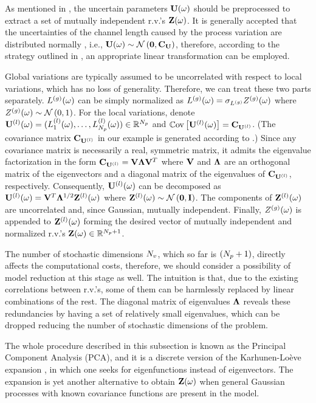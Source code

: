 As mentioned in , the uncertain parameters $\mathbf{U}(\omega)$ should be preprocessed to extract a set of mutually independent r.v.'s $\mathbf{Z}(\omega)$. It is generally accepted that the uncertainties of the channel length caused by the process variation are distributed normally \cite{srivastava2010, liu2007, juan2012}, i.e., $\vU(\o) \sim \normal{\vZero}{\mCov_\vU}$, therefore, according to the strategy outlined in , an appropriate linear transformation can be employed.

Global variations are typically assumed to be uncorrelated with respect to local variations, which has no loss of generality. Therefore, we can treat these two parts separately. ${L^{(g)}}(\omega)$ can be simply normalized as ${L^{(g)}}(\omega) = \sigma_{L^{(g)}} {Z^{(g)}}(\omega)$ where ${Z^{(g)}}(\omega) \sim \mathcal{N}\left( 0, 1 \right)$. For the local variations, denote ${\mathbf{U}^{(l)}}(\omega) = (L^{(l)}_1(\omega), \dotsc, L^{(l)}_{N_p}(\omega)) \in \mathbb{R}^{N_p}$ and $\oCov{\vlLeff(\o)} = \mCov_\vlLeff$. (The covariance matrix $\mCov_\vlLeff$ in our example is generated according to .) Since any covariance matrix is necessarily a real, symmetric matrix, it admits the eigenvalue factorization \cite{press2007} in the form $\mCov_\vlLeff = \m{V} \m{\Lambda} \m{V}^T$ where $\m{V}$ and $\m{\Lambda}$ are an orthogonal matrix of the eigenvectors and a diagonal matrix of the eigenvalues of $\mCov_\vlLeff$, respectively. Consequently, ${\mathbf{U}^{(l)}}(\omega)$ can be decomposed as $\vlLeff(\o) = \m{V}^T \m{\Lambda}^\ifrac{1}{2} \vlZ(\o)$ where $\vlZ(\o) \sim \normal{\vZero}{\mI}$. The components of ${\mathbf{Z}^{(l)}}(\omega)$ are uncorrelated and, since Gaussian, mutually independent. Finally, ${Z^{(g)}}(\omega)$ is appended to ${\mathbf{Z}^{(l)}}(\omega)$ forming the desired vector of mutually independent and normalized r.v.'s $\mathbf{Z}(\omega) \in \mathbb{R}^{{N_p} + 1}$.

The number of stochastic dimensions ${N_v}$, which so far is $({N_p} + 1)$, directly affects the computational costs, therefore, we should consider a possibility of model reduction at this stage as well. The intuition is that, due to the existing correlations between r.v.'s, some of them can be harmlessly replaced by linear combinations of the rest. The diagonal matrix of eigenvalues $\m{\Lambda}$ reveals these redundancies by having a set of relatively small eigenvalues, which can be dropped reducing the number of stochastic dimensions of the problem.

The whole procedure described in this subsection is known as the Principal Component Analysis (PCA), and it is a discrete version of the Karhunen-Lo\`{e}ve expansion \cite{loeve1978}, in which one seeks for eigenfunctions instead of eigenvectors. The expansion is yet another alternative to obtain $\mathbf{Z}(\omega)$ when general Gaussian processes with known covariance functions are present in the model.
